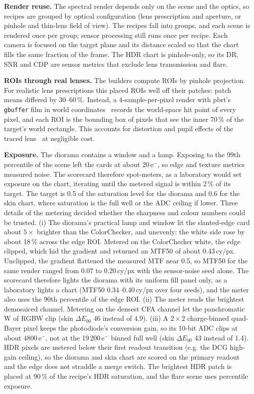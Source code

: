 \documentclass[letterpaper,twocolumn,fleqn]{article}
\begin{document}
\textbf{Render reuse.} The spectral render depends only on the scene and the optics, so recipes are grouped by optical configuration (lens prescription and aperture, or pinhole and thin-lens field of view). The \nRecipes{} recipes fall into \nGroups{} groups, and each scene is rendered once per group; sensor processing still runs once per recipe. Each camera is focused on the target plane and its distance scaled so that the chart fills the same fraction of the frame. The HDR chart is pinhole-only, so its DR, SNR and CDP are sensor metrics that exclude lens transmission and flare.

\textbf{ROIs through real lenses.} The builders compute ROIs by pinhole projection. For realistic lens prescriptions this placed ROIs well off their patches: patch means differed by 30--60\,\%. Instead, a 4-sample-per-pixel render with pbrt's \texttt{gbuffer} film in world coordinates~\cite{pbrtv4format} records the world-space hit point of every pixel, and each ROI is the bounding box of pixels that see the inner 70\,\% of the target's world rectangle. This accounts for distortion and pupil effects of the traced lens~\cite{kolb1995realistic} at negligible cost.

\textbf{Exposure.} The diorama contains a window and a lamp. Exposing to the 99th percentile of the scene left the cards at about 20\,e$^-$, so edge and texture metrics measured noise. The scorecard therefore spot-meters, as a laboratory would set exposure on the chart, iterating until the metered signal is within 2\,\% of its target. The target is 0.5 of the saturation level for the diorama and 0.6 for the skin chart, where saturation is the full well or the ADC ceiling if lower. Three details of the metering decided whether the sharpness and colour numbers could be trusted. (i) The diorama's practical lamp and window lit the slanted-edge card about $5\times$ brighter than the ColorChecker, and unevenly: the white side rose by about 18\,\% across the edge ROI. Metered on the ColorChecker white, the edge clipped, which hid the gradient and returned an MTF50 of about 0.43\,cy/px. Unclipped, the gradient flattened the measured MTF near 0.5, so MTF50 for the same render ranged from 0.07 to 0.20\,cy/px with the sensor-noise seed alone. The scorecard therefore lights the diorama with its uniform fill panel only, as a laboratory lights a chart (MTF50 0.34--0.40\,cy/px over four seeds), and the meter also uses the 90th percentile of the edge ROI. (ii) The meter reads the brightest demosaiced channel. Metering on the densest CFA channel let the panchromatic W of RGBW clip (skin $\Delta E_{00}$ 46 instead of 4.9). (iii) A $2\times2$ charge-binned quad-Bayer pixel keeps the photodiode's conversion gain, so its 10-bit ADC clips at about 4800\,e$^-$, not at the 19\,200\,e$^-$ binned full well (skin $\Delta E_{00}$ 43 instead of 1.4). HDR pixels are metered below their first readout transition (e.g. the DCG high-gain ceiling), so the diorama and skin chart are scored on the primary readout and the edge does not straddle a merge switch. The brightest HDR patch is placed at 90\,\% of the recipe's HDR saturation, and the flare scene uses percentile exposure.
\end{document}
